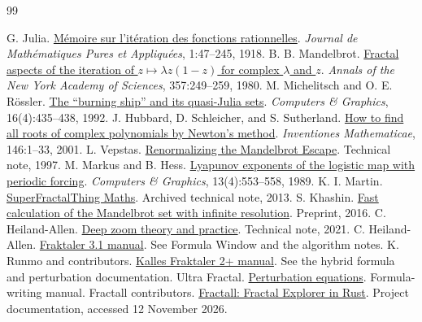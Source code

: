 \documentclass[11pt,a4paper]{article}
\numberwithin{equation}{section}
\begin{document}
\begingroup\small
\begin{thebibliography}{99}
\setlength{\itemsep}{1pt}
 G. Julia. \href{https://www.numdam.org/item/JMPA_1918_8_1__47_0/}{M\'emoire sur l'it\'eration des fonctions rationnelles}. \emph{Journal de Math\'ematiques Pures et Appliqu\'ees}, 1:47--245, 1918.
 B. B. Mandelbrot. \href{https://doi.org/10.1111/j.1749-6632.1980.tb29690.x}{Fractal aspects of the iteration of \(z\mapsto\lambda z(1-z)\) for complex \(\lambda\) and \(z\)}. \emph{Annals of the New York Academy of Sciences}, 357:249--259, 1980.
 M. Michelitsch and O. E. R\"ossler. \href{https://doi.org/10.1016/0097-8493(92)90032-Q}{The \textquotedblleft{}burning ship\textquotedblright{} and its quasi-Julia sets}. \emph{Computers \& Graphics}, 16(4):435--438, 1992.
 J. Hubbard, D. Schleicher, and S. Sutherland. \href{https://pi.math.cornell.edu/~hubbard/NewtonInventiones.pdf}{How to find all roots of complex polynomials by Newton's method}. \emph{Inventiones Mathematicae}, 146:1--33, 2001.
 L. Vepstas. \href{https://linas.org/art-gallery/escape/escape.html}{Renormalizing the Mandelbrot Escape}. Technical note, 1997.
 M. Markus and B. Hess. \href{https://doi.org/10.1016/0097-8493(89)90019-8}{Lyapunov exponents of the logistic map with periodic forcing}. \emph{Computers \& Graphics}, 13(4):553--558, 1989.
 K. I. Martin. \href{https://web.archive.org/web/20160408070057/http://superfractalthing.co.nf/sft_maths.pdf}{SuperFractalThing Maths}. Archived technical note, 2013.
 S. Khashin. \href{https://math.ivanovo.ac.ru/dalgebra/Khashin/man2/Mandelbrot.pdf}{Fast calculation of the Mandelbrot set with infinite resolution}. Preprint, 2016.
 C. Heiland-Allen. \href{https://mathr.co.uk/blog/2021-05-14_deep_zoom_theory_and_practice.html}{Deep zoom theory and practice}. Technical note, 2021.
 C. Heiland-Allen. \href{https://fraktaler.mathr.co.uk/}{Fraktaler 3.1 manual}. See Formula Window and the algorithm notes.
 K. Runmo and contributors. \href{https://mathr.co.uk/kf/manual.html}{Kalles Fraktaler 2+ manual}. See the hybrid formula and perturbation documentation.
 Ultra Fractal. \href{https://www.ultrafractal.com/help/writing/formulas/perturbationequations.html}{Perturbation equations}. Formula-writing manual.
 Fractall contributors. \href{https://github.com/habib256/fractall-rust}{Fractall: Fractal Explorer in Rust}. Project documentation, accessed 12 November 2026.

\end{thebibliography}
\end{document}
